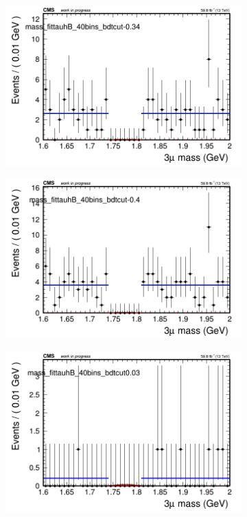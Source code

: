 \begin{figure}[H]
\begin{subfigure}{0.2\textwidth}
        \caption{}
    \end{subfigure}
    \begin{subfigure}{0.2\textwidth}
        \includegraphics[width=\textwidth]{flat_fit/plots/tauhB/massfit_tauhB_40bins_bdtcut-0.34.png}
        \caption{}
    \end{subfigure}
    \begin{subfigure}{0.2\textwidth}
        \includegraphics[width=\textwidth]{flat_fit/plots/tauhB/massfit_tauhB_40bins_bdtcut-0.4.png}
        \caption{}
    \end{subfigure}
    \begin{subfigure}{0.2\textwidth}
        \includegraphics[width=\textwidth]{flat_fit/plots/tauhB/massfit_tauhB_40bins_bdtcut0.03.png}

\end{subfigure}
\end{figure}
